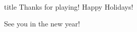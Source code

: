 \documentclass[11pt]{beamer}
\begin{document}
\section*{\ }
\subsection*{\ }
\begingroup{}
\begin{frame}
    \vfill{}
    \centering{}
    \begin{beamercolorbox}[sep=8pt,center,shadow=true,rounded=true]{title}
        Thanks for playing! Happy Holidays!\par%
        See you in the new year!
    \end{beamercolorbox}
    \vfill{}
\end{frame}
\endgroup{}
\end{document}
